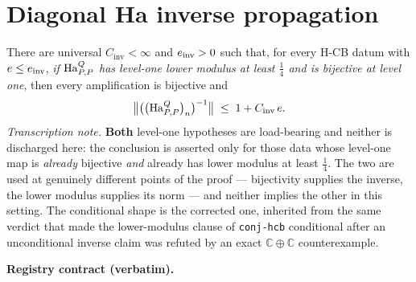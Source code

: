 \section{Diagonal Ha inverse propagation}\label{sec:hcb3-diagonal-inverse}

\begin{lemma}\label{lem:hcb3-diagonal-inverse}
There are universal $C_{\mathrm{inv}}<\infty$ and $e_{\mathrm{inv}}>0$ such that, for
every H-CB datum with $e\le e_{\mathrm{inv}}$, \emph{if $\mathrm{Ha}^{Q}_{P,P}$ has
level-one lower modulus at least $\tfrac14$ and is bijective at level one}, then every
amplification is bijective and
\begin{equation}\label{eq:di-main}
  \bigl\lVert\bigl(\bigl(\mathrm{Ha}^{Q}_{P,P}\bigr)_{n}\bigr)^{-1}\bigr\rVert\;\le\;1+C_{\mathrm{inv}}\,e .
\end{equation}
\emph{Transcription note.} \textbf{Both} level-one hypotheses are load-bearing and neither
is discharged here: the conclusion is asserted only for those data whose level-one map is
\emph{already} bijective \emph{and} already has lower modulus at least $\tfrac14$. The two
are used at genuinely different points of the proof --- bijectivity supplies the inverse,
the lower modulus supplies its norm --- and neither implies the other in this setting. The
conditional shape is the corrected one, inherited from the same verdict that made the
lower-modulus clause of \texttt{conj-hcb} conditional after an unconditional inverse claim
was refuted by an exact $\mathbb C\oplus\mathbb C$ counterexample.
\end{lemma}

\noindent\textbf{Registry contract (verbatim).}

